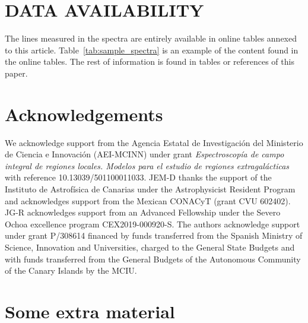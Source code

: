 \documentclass[fleqn,usenatbib]{mnras}
\begin{document}
\section*{DATA AVAILABILITY}
The lines measured in the spectra are entirely available in online tables annexed to this article. Table~\ref{tab:sample_spectra} is an example of the content found in the online tables. The rest of information is found in tables or references of this paper.



\section*{Acknowledgements}

We acknowledge support from the Agencia Estatal de Investigaci\'on del Ministerio de Ciencia e Innovaci\'on (AEI-MCINN) under grant {\it Espectroscop\'ia de campo integral de regiones  locales. Modelos para el estudio de regiones  extragal\'acticas} with reference 10.13039/501100011033. JEM-D thanks the support of the Instituto de Astrof\'isica de Canarias under the Astrophysicist Resident Program and acknowledges support from the Mexican CONACyT (grant CVU 602402). JG-R acknowledges support from an Advanced Fellowship under the Severo Ochoa excellence program CEX2019-000920-S. The authors acknowledge support under grant P/308614 financed by funds transferred from the Spanish Ministry of Science, Innovation and Universities, charged to the General State Budgets and with funds transferred from the General Budgets of the Autonomous Community of the Canary Islands by the MCIU. 








\newpage


\appendix


\section{Some extra material}
\label{sec:apendix_A}
\end{document}
